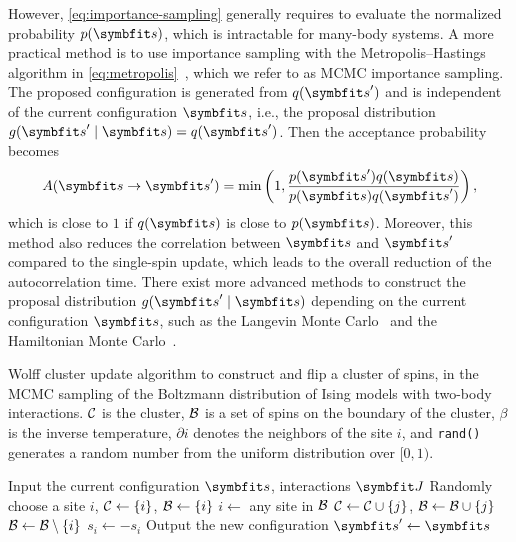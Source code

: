 However, \cref{eq:importance-sampling} generally requires to evaluate the normalized probability $p(\vs)$, which is intractable for many-body systems. A more practical method is to use importance sampling with the Metropolis--Hastings algorithm in \cref{eq:metropolis}~\cite{liesenfeld2008improving, schuster2020markov}, which we refer to as MCMC importance sampling. The proposed configuration is generated from $q(\vs')$ and is independent of the current configuration $\vs$, i.e., the proposal distribution $g(\vs' \mid \vs) = q(\vs')$. Then the acceptance probability becomes
\begin{equation}
A(\vs \to \vs') = \min\left( 1, \frac{p(\vs') q(\vs)}{p(\vs) q(\vs')} \right),
\label{eq:mcmc-importance}
\end{equation}
which is close to $1$ if $q(\vs)$ is close to $p(\vs)$. Moreover, this method also reduces the correlation between $\vs$ and $\vs'$ compared to the single-spin update, which leads to the overall reduction of the autocorrelation time. There exist more advanced methods to construct the proposal distribution $g(\vs' \mid \vs)$ depending on the current configuration $\vs$, such as the Langevin Monte Carlo~\cite{rossky1978brownian} and the Hamiltonian Monte Carlo~\cite{duane1987hybrid}.

\begin{algorithm}[H]
\caption[Wolff cluster update algorithm]{
Wolff cluster update algorithm to construct and flip a cluster of spins, in the MCMC sampling of the Boltzmann distribution of Ising models with two-body interactions.
$\mathcal{C}$ is the cluster, $\mathcal{B}$ is a set of spins on the boundary of the cluster, $\beta$ is the inverse temperature, $\partial i$ denotes the neighbors of the site $i$, and \texttt{rand()} generates a random number from the uniform distribution over $[0, 1)$.
}
\label{alg:wolff}
\begin{algorithmic}[1]
\STATE Input the current configuration $\vs$, interactions $\mJ$
\STATE Randomly choose a site $i$, $\mathcal{C} \gets \{i\}$, $\mathcal{B} \gets \{i\}$
\WHILE{$\calB \neq \emptyset$}
    \STATE $i \gets$ any site in $\mathcal{B}$
            \STATE $\mathcal{C} \gets \mathcal{C} \cup \{j\}$, $\mathcal{B} \gets \mathcal{B} \cup \{j\}$
        \ENDIF
    \ENDFOR
    \STATE $\mathcal{B} \gets \mathcal{B} \setminus \{i\}$
\ENDWHILE
{}
    \STATE $s_i \gets -s_i$
\ENDFOR
\STATE Output the new configuration $\vs' \gets \vs$
\end{algorithmic}
\end{algorithm}


